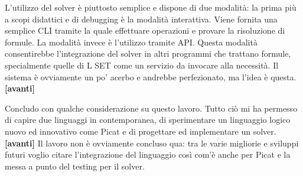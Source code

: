 \documentclass[11pt]{article}
\newcommand*{\nextslide}{\textbf{[avanti]}}
\begin{document}
L'utilizzo del solver è piuttosto semplice e dispone di due modalità:
la prima più a scopi didattici e di debugging è la modalità
interattiva. Viene fornita una semplice CLI tramite la quale
effettuare operazioni e provare la risoluzione di formule. La modalità
invece è l'utilizzo tramite API. Questa modalità consentirebbe
l'integrazione del solver in altri programmi che trattano formule,
specialmente quelle di L SET come un servizio da invocare alla
necessità. Il sistema è ovviamente un po' acerbo e andrebbe
perfezionato, ma l'idea è questa. \nextslide{}

Concludo con qualche considerazione su questo lavoro. Tutto ciò mi ha
permesso di capire due linguaggi in contemporanea, di sperimentare un
linguaggio logico nuovo ed innovativo come Picat e di progettare ed
implementare un solver. \nextslide{} Il lavoro non è ovviamente
concluso qua: tra le varie migliorie e sviluppi futuri voglio citare
l'integrazione del linguaggio \lset{} così com'è anche per Picat e la
messa a punto del testing per il solver.
\end{document}
